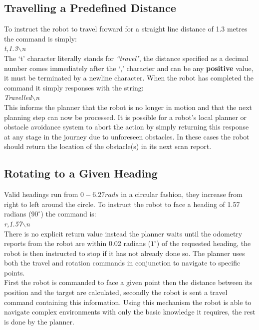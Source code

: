 \subsection{Travelling a Predefined Distance}
\noindent
To instruct the robot to travel forward for a straight line distance of 1.3 metres the command is simply: \\

\textit{t,1.3$\backslash$n} \\

\noindent
The `t' character literally stands for \textit{``travel"}, the distance specified as a decimal number comes immediately after the `,' character and can be any \textbf{positive} value, it must be terminated by a newline character. When the robot has completed the command it simply responses with the string: \\

\textit{Travelled$\backslash$n} \\

\noindent
This informs the planner that the robot is no longer in motion and that the next planning step can now be processed. It is possible for a robot's local planner or obstacle avoidance system to abort the action by simply returning this response at any stage in the journey due to unforeseen obstacles. In these cases the robot should return the location of the obstacle(s) in its next scan report.

\subsection{Rotating to a Given Heading}
\noindent
Valid headings run from $0-6.27 rads$ in a circular fashion, they increase from right to left around the circle. To instruct the robot to face a heading of 1.57 radians ($90^{\circ}$) the command is: \\

\textit{r,1.57$\backslash$n} \\

\noindent
There is no explicit return value instead the planner waits until the odometry reports from the robot are within 0.02 radians ($1^{\circ}$) of the requested heading, the robot is then instructed to stop if it has not already done so. The planner uses both the travel and rotation commands in conjunction to navigate to specific points. \\

\noindent
First the robot is commanded to face a given point then the distance between its position and the target are calculated, secondly the robot is sent a travel command containing this information. Using this mechanism the robot is able to navigate complex environments with only the basic knowledge it requires, the rest is done by the planner.


